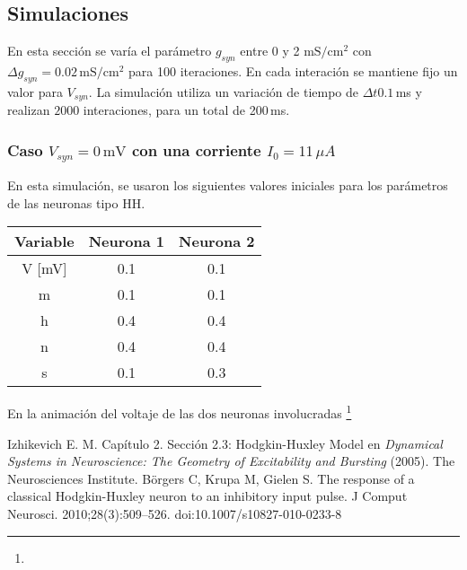 \subsection{Simulaciones}

En esta sección se varía el parámetro $g_{syn}$ entre $0$ y 2 ${\text{mS}}/{\text{cm}^2}$ con $\Delta g_{syn}=0.02\,{\text{mS}}/{\text{cm}^2}$ para 100 iteraciones. En cada interación se mantiene fijo un valor para $V_{syn}$. La simulación utiliza un variación de tiempo de $\Delta t 0.1\,$ms y realizan $2000$ interaciones, para un total de 200\,ms.

    \subsubsection{Caso $V_{syn}= 0\,\text{mV}$ con una corriente $I_0 = 11\,\mu A$}

    En esta simulación, se usaron los siguientes valores iniciales para los parámetros de las neuronas tipo HH.
    \begin{table}[H]
    \centering
    \begin{tabular}{c| c| c}
    {\bf Variable }& {\bf Neurona 1} & { \bf Neurona 2} \\ \hline
        V [mV]     & 0.1             & 0.1               \\  \hline
        m          & 0.1             & 0.1              \\  \hline
        h          & 0.4             & 0.4               \\  \hline
        n          & 0.4             & 0.4               \\  \hline
        s          & 0.1             & 0.3               \\  \hline
    
    \end{tabular}
    
    \end{table}

    En la animación del voltaje de las dos neuronas involucradas \footnote{}





\begin{thebibliography}{50}

{} Izhikevich E. M. Capítulo 2. Sección 2.3: Hodgkin-Huxley Model en {\sl Dynamical Systems in Neuroscience: The Geometry of Excitability and Bursting} (2005).  The Neurosciences Institute.
 Börgers C, Krupa M, Gielen S. The response of a classical Hodgkin-Huxley neuron to an inhibitory input pulse. J Comput Neurosci. 2010;28(3):509–526. doi:10.1007/s10827-010-0233-8

\end{thebibliography}

